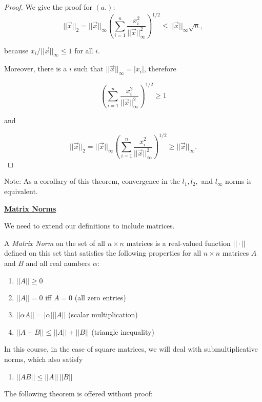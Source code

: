 \documentclass[12pt]{article}
\newcommand{\vecx}{\ensuremath{\vec{x}}}
\newenvironment{definition}[1][Definition]{\begin{trivlist}
\item[\hskip \labelsep {\bfseries #1}]}{\end{trivlist}}
\begin{document}
\begin{proof}
We give the proof for $(a.)$:  
\[
||\vecx||_2 = ||\vecx||_\infty
\left(\sum_{i=1}^n\frac{x_i^2}{||\vecx||_\infty^2}\right)^{1/2} \leq
||\vecx||_\infty\sqrt{n},
\]

because $x_i/||\vecx||_\infty \leq 1$ for all $i$.

Moreover, there is a $i$ such that $||\vecx||_\infty=|x_i|$, therefore

\[
\left(\sum_{i=1}^n\frac{x_i^2}{||\vecx||_\infty^2}\right)^{1/2}\geq 1
\]

and

\[
||\vecx||_2 = ||\vecx||_\infty
\left(\sum_{i=1}^n\frac{x_i^2}{||\vecx||_\infty^2}\right)^{1/2} \geq
||\vecx||_\infty.
\]
\end{proof}

Note: As a corollary of this theorem, convergence in the $l_1, l_2,$ and
$l_\infty$ norms is equivalent.

\underline{\textbf{Matrix Norms}}

We need to extend our definitions to include matrices.

\begin{definition}
A \textit{Matrix Norm} on the set of all $n \times n$ matrices is a 
real-valued function $||\cdot||$ defined on this set that satisfies the 
following properties for all $n \times n$ matrices $A$ and $B$ and all real 
numbers $\alpha$:

\begin{enumerate}
\item $|| A|| \geq 0$ 
\item $|| A|| = 0$ iff $A = 0$ (all zero entries)
\item $|| \alpha A|| = |\alpha| ||A||$ (scalar multiplication)
\item $|| A + B|| \leq ||A|| + ||B||$ (triangle inequality)
\end{enumerate}

In this course, in the case of square matrices, we will deal with 
submultiplicative norms, which also satisfy

\begin{enumerate}
\item[5.] $|| AB|| \leq ||A||\, ||B||$
\end{enumerate}
\end{definition}

\vspace*{1em}

The following theorem is offered without proof:
\end{document}
